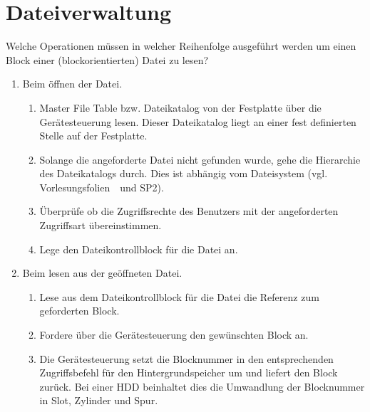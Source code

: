 \section{Dateiverwaltung}
Welche Operationen müssen in welcher Reihenfolge ausgeführt werden um einen Block einer (blockorientierten) Datei zu lesen?

\begin{enumerate}
\item Beim öffnen der Datei.
\begin{solution}
\begin{enumerate}
	\item Master File Table bzw. Dateikatalog von der Festplatte über die Gerätesteuerung lesen.
	Dieser Dateikatalog liegt an einer fest definierten Stelle auf der Festplatte.
	\item Solange die angeforderte Datei nicht gefunden wurde, gehe die Hierarchie des Dateikatalogs durch.
	Dies ist abhängig vom Dateisystem (vgl. Vorlesungsfolien~\Katalogeintraege~und SP2).
	\item Überprüfe ob die Zugriffsrechte des Benutzers mit der angeforderten Zugriffsart übereinstimmen.
	\item Lege den Dateikontrollblock für die Datei an.
\end{enumerate}
\end{solution}
\item Beim lesen aus der geöffneten Datei.
\begin{solution}
\begin{enumerate}
	\item Lese aus dem Dateikontrollblock für die Datei die Referenz zum geforderten Block.
	\item Fordere über die Gerätesteuerung den gewünschten Block an.
	\item Die Gerätesteuerung setzt die Blocknummer in den entsprechenden Zugriffsbefehl für den Hintergrundspeicher um und liefert den Block zurück.
	Bei einer HDD beinhaltet dies die Umwandlung der Blocknummer in Slot, Zylinder und Spur.
\end{enumerate}
\end{solution}
\end{enumerate}
